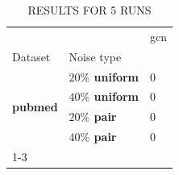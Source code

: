 \begin{table}
\caption{RESULTS FOR 5 RUNS}
\begin{tabular}{lll}
\toprule
 &  & gcn \\
Dataset & Noise type &  \\
\midrule
\multirow[t]{4}{*}{\textbf{pubmed}} & \textbf{$ 20 \% $ uniform} & 0 \\
\textbf{} & \textbf{$ 40 \% $ uniform} & 0 \\
\textbf{} & \textbf{$ 20 \% $ pair} & 0 \\
\textbf{} & \textbf{$ 40 \% $ pair} & 0 \\
\cline{1-3}
\bottomrule
\end{tabular}
\end{table}

